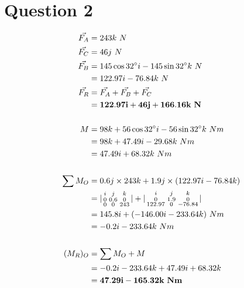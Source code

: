 \documentclass{article}
\begin{document}
\section*{Question 2}
\begin{align*}
    \vec{F_A} & = 243k\ N                                                 \\
    \vec{F_C} & = 46j\ N                                                  \\
    \vec{F_B} & = 145\cos 32^\circ i - 145\sin 32^\circ k\ N              \\
              & = 122.97i - 76.84k\ N                                     \\
    \vec{F_R} & = \vec{F_A} + \vec{F_B} + \vec{F_C}                       \\
              & = \mathbf{122.97i + 46j + 166.16k\ N}                     \\ \hrulefill \\
    M         & = 98k +56\cos 32^\circ i - 56\sin 32^\circ k\ Nm          \\
              & = 98k + 47.49i - 29.68k\ Nm                               \\
              & = 47.49i + 68.32k\ Nm                                     \\ \hrulefill \\
    \sum{M_O} & = 0.6j\times 243k  + 1.9j \times (122.97i - 76.84k)       \\
              & = |\begin{smallmatrix}
                       i & j   & k   \\
                       0 & 0.6 & 0   \\
                       0 & 0   & 243\end{smallmatrix}| + |\begin{smallmatrix}
                                                          i     & j     & k   \\
                                                          0      & 1.9    & 0 \\
                                                          122.97 & 0 & -76.84
                                                      \end{smallmatrix}| \\
              & = 145.8i + (-146.00i -233.64k)\ Nm                        \\
              & = -0.2i - 233.64k\ Nm                                     \\ \hrulefill \\
    (M_R)_O   & = \sum{M_O} + M                                           \\
              & = -0.2i - 233.64k + 47.49i + 68.32k                       \\
              & = \mathbf{47.29i - 165.32k\ Nm}                           \\
\end{align*}
\end{document}
